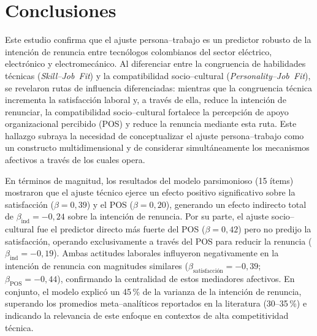 \section{Conclusiones}

Este estudio confirma que el ajuste persona–trabajo es un predictor robusto de la intención de renuncia entre tecnólogos colombianos del sector eléctrico, electrónico y electromecánico. Al diferenciar entre la congruencia de habilidades técnicas (\emph{Skill--Job Fit}) y la compatibilidad socio–cultural (\emph{Personality--Job Fit}), se revelaron rutas de influencia diferenciadas: mientras que la congruencia técnica incrementa la satisfacción laboral y, a través de ella, reduce la intención de renunciar, la compatibilidad socio–cultural fortalece la percepción de apoyo organizacional percibido (POS) y reduce la renuncia mediante esta ruta. Este hallazgo subraya la necesidad de conceptualizar el ajuste persona–trabajo como un constructo multidimensional y de considerar simultáneamente los mecanismos afectivos a través de los cuales opera.

En términos de magnitud, los resultados del modelo parsimonioso (15 ítems) mostraron que el ajuste técnico ejerce un efecto positivo significativo sobre la satisfacción ($\beta=0{,}39$) y el POS ($\beta=0{,}20$), generando un efecto indirecto total de $\beta_{\text{ind}}=-0{,}24$ sobre la intención de renuncia. Por su parte, el ajuste socio–cultural fue el predictor directo más fuerte del POS ($\beta=0{,}42$) pero no predijo la satisfacción, operando exclusivamente a través del POS para reducir la renuncia ($\beta_{\text{ind}}=-0{,}19$). Ambas actitudes laborales influyeron negativamente en la intención de renuncia con magnitudes similares ($\beta_{\text{satisfacción}}=-0{,}39$; $\beta_{\text{POS}}=-0{,}44$), confirmando la centralidad de estos mediadores afectivos. En conjunto, el modelo explicó un 45\,\% de la varianza de la intención de renuncia, superando los promedios meta–analíticos reportados en la literatura (30–35\,\%) e indicando la relevancia de este enfoque en contextos de alta competitividad técnica.

